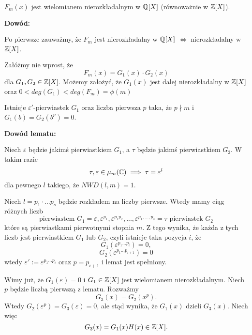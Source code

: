 \begin{uwaga} $F_m(x)$ jest wielomianem nierozkładalnym w $\mathbb{Q}[X]$ (równoważnie w $\mathbb{Z}[X]$).
\end{uwaga}

\textbf{Dowód:} 

Po pierwsze zauważmy, że $F_m$ jest nierozkładalny w $\mathbb{Q}[X]$ $\iff$ nierozkładalny w $\mathbb{Z}[X]$. 

Załóżmy nie wprost, że
$$F_m(x)=G_1(x)\cdot G_2(x)$$
dla $G_1,G_2\in\mathbb{Z}[X]$. Możemy założyć, że $G_1(x)$ jest dalej nierozkładalny w $\mathbb{Z}[X]$ oraz $0<deg(G_1)<deg(F_m)=\phi(m)$
\medskip

\medskip

 Istnieje $\varepsilon'$-pierwiastek $G_1$ oraz liczba pierwsza $p$ taka, że $p\nmid m$ i $G_1(b)=G_2(b^p)=0$.

\textbf{Dowód lematu:}

Niech $\varepsilon$ będzie jakimś pierwiastkiem $G_1$, a $\tau$ będzie jakimś pierwiastkiem $G_2$. W takim razie
$$\tau,\varepsilon\in\mu_m(\mathbb{C})\implies\tau=\varepsilon^l$$
dla pewnego $l$ takiego, że $NWD(l,m)=1$.


Niech $l=p_1\cdot...p_s$ będzie rozkładem na liczby pierwsze. Wtedy mamy ciąg różnych liczb
$$\text{pierwiastem }G_1=\varepsilon, \varepsilon^{p_1},\varepsilon^{p_1p_2},...,\varepsilon^{p_1,...,p_s}=\tau\text{ pierwiastek }G_2$$
które są pierwiastkami pierwotnymi stopnia $m$. Z tego wynika, że każda z tych liczb jest pierwiastkiem $G_1$ lub $G_2$, czyli istnieje taka pozycja $i$, że
$$G_1(\varepsilon^{p_1...p_i})=0,$$
$$G_2(\varepsilon^{p_1...p_{i+1}})=0$$
wtedy $\varepsilon':=\varepsilon^{p_1...p_i}$ oraz $p=p_{i+1}$ i lemat jest spełniony.
\medskip

\medskip

Wimy już, że $G_1(\varepsilon)=0$ i $G_1\in\mathbb{Z}[X]$ jest wielomianem nierozkładalnym. Niech $p$ będzie liczbą pierwszą z lematu. Rozważmy
$$G_3(x)=G_2(x^p).$$
Wtedy $G_2(\varepsilon^p)=G_3(\varepsilon)=0$, ale stąd wynika, że $G_1(x)$ dzieli $G_3(x)$. Niech więc 
$$G_3(x)=G_1(x)H(x)\in\mathbb{Z}[X].$$

